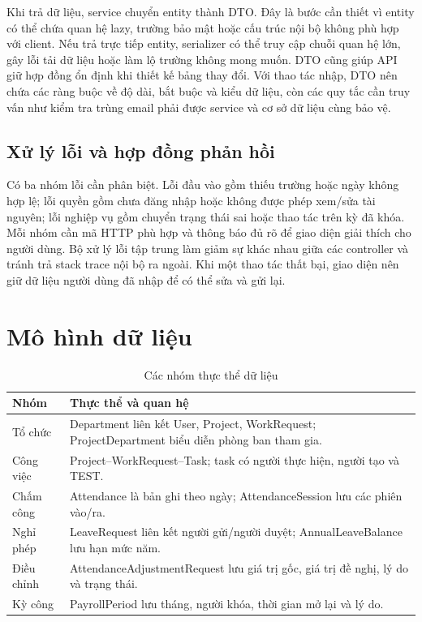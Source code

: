 \documentclass[12pt,a4paper,oneside]{report}
\begin{document}
Khi trả dữ liệu, service chuyển entity thành DTO. Đây là bước cần thiết vì entity có thể chứa quan hệ lazy, trường bảo mật hoặc cấu trúc nội bộ không phù hợp với client. Nếu trả trực tiếp entity, serializer có thể truy cập chuỗi quan hệ lớn, gây lỗi tải dữ liệu hoặc làm lộ trường không mong muốn. DTO cũng giúp API giữ hợp đồng ổn định khi thiết kế bảng thay đổi. Với thao tác nhập, DTO nên chứa các ràng buộc về độ dài, bắt buộc và kiểu dữ liệu, còn các quy tắc cần truy vấn như kiểm tra trùng email phải được service và cơ sở dữ liệu cùng bảo vệ.

\subsection{Xử lý lỗi và hợp đồng phản hồi}
Có ba nhóm lỗi cần phân biệt. Lỗi đầu vào gồm thiếu trường hoặc ngày không hợp lệ; lỗi quyền gồm chưa đăng nhập hoặc không được phép xem/sửa tài nguyên; lỗi nghiệp vụ gồm chuyển trạng thái sai hoặc thao tác trên kỳ đã khóa. Mỗi nhóm cần mã HTTP phù hợp và thông báo đủ rõ để giao diện giải thích cho người dùng. Bộ xử lý lỗi tập trung làm giảm sự khác nhau giữa các controller và tránh trả stack trace nội bộ ra ngoài. Khi một thao tác thất bại, giao diện nên giữ dữ liệu người dùng đã nhập để có thể sửa và gửi lại.

\section{Mô hình dữ liệu}
\begin{table}[H]\centering\caption{Các nhóm thực thể dữ liệu}
\begin{tabularx}{\textwidth}{p{4cm}X}\toprule\textbf{Nhóm}&\textbf{Thực thể và quan hệ}\\\midrule
Tổ chức&Department liên kết User, Project, WorkRequest; ProjectDepartment biểu diễn phòng ban tham gia.\\
Công việc&Project--WorkRequest--Task; task có người thực hiện, người tạo và TEST.\\
Chấm công&Attendance là bản ghi theo ngày; AttendanceSession lưu các phiên vào/ra.\\
Nghỉ phép&LeaveRequest liên kết người gửi/người duyệt; AnnualLeaveBalance lưu hạn mức năm.\\
Điều chỉnh&AttendanceAdjustmentRequest lưu giá trị gốc, giá trị đề nghị, lý do và trạng thái.\\
Kỳ công&PayrollPeriod lưu tháng, người khóa, thời gian mở lại và lý do.\\\bottomrule
\end{tabularx}\end{table}
\end{document}
